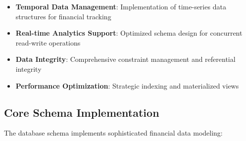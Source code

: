 \documentclass[conference]{IEEEtran}
\begin{document}
\begin{itemize}
\item \textbf{Temporal Data Management}: Implementation of time-series data structures for financial tracking
\item \textbf{Real-time Analytics Support}: Optimized schema design for concurrent read-write operations
\item \textbf{Data Integrity}: Comprehensive constraint management and referential integrity
\item \textbf{Performance Optimization}: Strategic indexing and materialized views
\end{itemize}

\subsection{Core Schema Implementation}
The database schema implements sophisticated financial data modeling:
\end{document}
